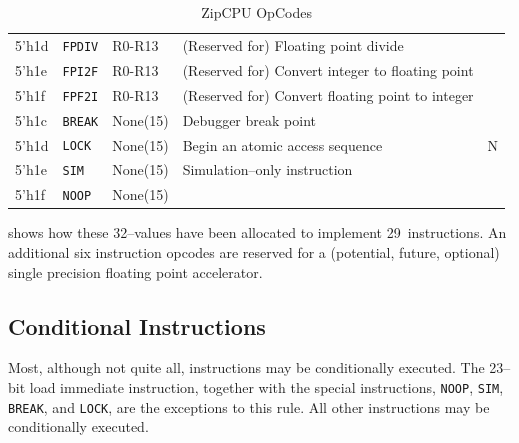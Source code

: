 \documentclass{gqtekspec}
\begin{document}
\begin{table}
\begin{center}
\begin{tabular}{|l|l|l|l|c|}
5'h1d & {\tt FPDIV} & R0-R13 & (Reserved for) Floating point divide &   \\\cline{1-4}
5'h1e & {\tt FPI2F} & R0-R13 & (Reserved for) Convert integer to floating point &   \\\cline{1-4}
5'h1f & {\tt FPF2I} & R0-R13 & (Reserved for) Convert floating point to integer &   \\\hline\hline
5'h1c & {\tt BREAK} &None(15)& Debugger break point & \\\cline{1-4}
5'h1d & {\tt LOCK} &None(15)& Begin an atomic access sequence & N\\\cline{1-4}
5'h1e & {\tt SIM}  &None(15)& Simulation--only instruction &\\\cline{1-4}
5'h1f & {\tt NOOP} &None(15)&&\\\hline
\end{tabular}
\caption{ZipCPU OpCodes}\label{tbl:iset-opcodes}
\end{center}\end{table}
shows how these 32--values have been allocated to implement 29~instructions.
An additional six instruction opcodes are reserved for a (potential, future,
optional) single precision floating point accelerator.

\subsection{Conditional Instructions}\label{sec:isa-cond}
Most, although not quite all, instructions may be conditionally executed.  
The 23--bit load immediate instruction, together with the special instructions,
{\tt NOOP}, {\tt SIM}, {\tt BREAK}, and {\tt LOCK}, are the exceptions to this
rule.  All other instructions may be conditionally executed.
\end{document}
